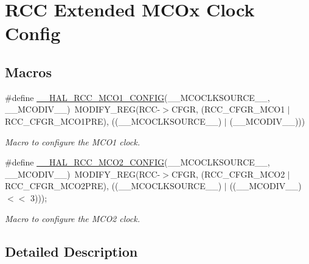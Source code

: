 \hypertarget{group___r_c_c_ex___m_c_ox___clock___config}{}\section{R\+CC Extended M\+C\+Ox Clock Config}
\label{group___r_c_c_ex___m_c_ox___clock___config}
\subsection*{Macros}
\begin{DoxyCompactItemize}
\item 
\#define \mbox{\hyperlink{group___r_c_c_ex___m_c_ox___clock___config_ga7e5f7f1efc92794b6f0e96068240b45e}{\+\_\+\+\_\+\+H\+A\+L\+\_\+\+R\+C\+C\+\_\+\+M\+C\+O1\+\_\+\+C\+O\+N\+F\+IG}}(\+\_\+\+\_\+\+M\+C\+O\+C\+L\+K\+S\+O\+U\+R\+C\+E\+\_\+\+\_\+,  \+\_\+\+\_\+\+M\+C\+O\+D\+I\+V\+\_\+\+\_\+)~M\+O\+D\+I\+F\+Y\+\_\+\+R\+EG(R\+CC-\/$>$C\+F\+GR, (R\+C\+C\+\_\+\+C\+F\+G\+R\+\_\+\+M\+C\+O1 $\vert$ R\+C\+C\+\_\+\+C\+F\+G\+R\+\_\+\+M\+C\+O1\+P\+RE), ((\+\_\+\+\_\+\+M\+C\+O\+C\+L\+K\+S\+O\+U\+R\+C\+E\+\_\+\+\_\+) $\vert$ (\+\_\+\+\_\+\+M\+C\+O\+D\+I\+V\+\_\+\+\_\+)))
\begin{DoxyCompactList}\small\item\em Macro to configure the M\+C\+O1 clock. \end{DoxyCompactList}\item 
\#define \mbox{\hyperlink{group___r_c_c_ex___m_c_ox___clock___config_gabb7360422910dd65312786fc49722d25}{\+\_\+\+\_\+\+H\+A\+L\+\_\+\+R\+C\+C\+\_\+\+M\+C\+O2\+\_\+\+C\+O\+N\+F\+IG}}(\+\_\+\+\_\+\+M\+C\+O\+C\+L\+K\+S\+O\+U\+R\+C\+E\+\_\+\+\_\+,  \+\_\+\+\_\+\+M\+C\+O\+D\+I\+V\+\_\+\+\_\+)~M\+O\+D\+I\+F\+Y\+\_\+\+R\+EG(R\+CC-\/$>$C\+F\+GR, (R\+C\+C\+\_\+\+C\+F\+G\+R\+\_\+\+M\+C\+O2 $\vert$ R\+C\+C\+\_\+\+C\+F\+G\+R\+\_\+\+M\+C\+O2\+P\+RE), ((\+\_\+\+\_\+\+M\+C\+O\+C\+L\+K\+S\+O\+U\+R\+C\+E\+\_\+\+\_\+) $\vert$ ((\+\_\+\+\_\+\+M\+C\+O\+D\+I\+V\+\_\+\+\_\+) $<$$<$ 3)));
\begin{DoxyCompactList}\small\item\em Macro to configure the M\+C\+O2 clock. \end{DoxyCompactList}\end{DoxyCompactItemize}


\subsection{Detailed Description}


